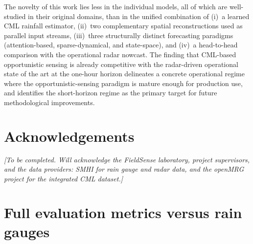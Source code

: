 \documentclass[12pt, a4paper]{article}
\begin{document}
The novelty of this work lies less in the individual models, all of
which are well-studied in their original domains, than in the unified
combination of (i)~a learned CML rainfall estimator, (ii)~two
complementary spatial reconstructions used as parallel input streams,
(iii)~three structurally distinct forecasting paradigms
(attention-based, sparse-dynamical, and state-space), and (iv)~a
head-to-head comparison with the operational radar nowcast. The
finding that CML-based opportunistic sensing is already competitive
with the radar-driven operational state of the art at the one-hour
horizon delineates a concrete operational regime where the
opportunistic-sensing paradigm is mature enough for production use,
and identifies the short-horizon regime as the primary target for
future methodological improvements.

\section*{Acknowledgements}
\textit{[To be completed. Will acknowledge the FieldSense laboratory,
project supervisors, and the data providers: SMHI for rain gauge and
radar data, and the openMRG project for the integrated CML dataset.]}

\appendix

\section{Full evaluation metrics versus rain gauges}\label{app:gauges}
\end{document}
